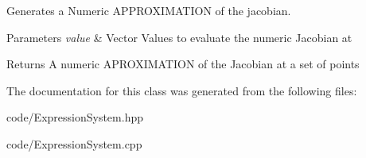 Generates a Numeric A\+P\+P\+R\+O\+X\+I\+M\+A\+T\+I\+ON of the jacobian. 


\begin{DoxyParams}{Parameters}
{\em value} & Vector Values to evaluate the numeric Jacobian at \\
\hline
\end{DoxyParams}
\begin{DoxyReturn}{Returns}
A numeric A\+P\+R\+O\+X\+I\+M\+A\+T\+I\+ON of the Jacobian at a set of points 
\end{DoxyReturn}


The documentation for this class was generated from the following files\+:\begin{DoxyCompactItemize}
\item 
code/Expression\+System.\+hpp\item 
code/Expression\+System.\+cpp\end{DoxyCompactItemize}
